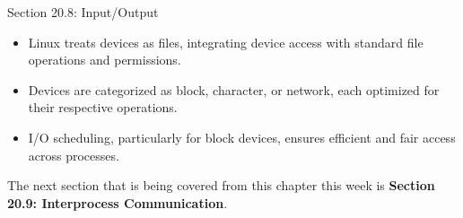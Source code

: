 \begin{notes}{Section 20.8: Input/Output}
    \begin{highlight}
        \begin{itemize}
            \item Linux treats devices as files, integrating device access with standard file operations and permissions.
            \item Devices are categorized as block, character, or network, each optimized for their respective operations.
            \item I/O scheduling, particularly for block devices, ensures efficient and fair access across processes.
        \end{itemize}
    \end{highlight}
\end{notes}

The next section that is being covered from this chapter this week is \textbf{Section 20.9: Interprocess Communication}.

